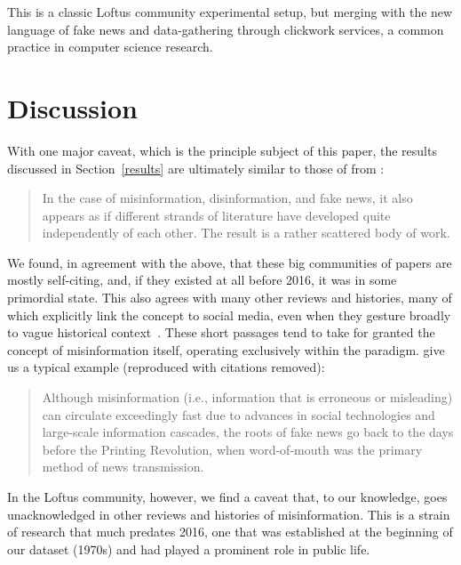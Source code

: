 \documentclass[          
 pre,
 twocolumn,
 twoside,
 superscriptaddress,
 amsmath,
 amssymb,                
 apsf
]{revtex4-2}
\begin{document}
This is a classic Loftus community experimental setup, but merging with the new language of fake news and data-gathering through clickwork services, a common practice in computer science research.

\section{Discussion}
\label{discussion}

With one major caveat, which is the principle subject of this paper, the results discussed in Section~\ref{results} are ultimately similar to those of from \citet{broda_misinformation_2024}:

\begin{quote}
In the case of misinformation, disinformation, and fake news, it also appears as if different strands of literature have developed quite independently of each other. The result is a rather scattered body of work.
\end{quote}

We found, in agreement with the above, that these big communities of papers are mostly self-citing, and, if they existed at all before 2016, it was in some primordial state. This also agrees with many other reviews and histories, many of which explicitly link the concept to social media, even when they gesture broadly to vague historical context~\cite{donovan_express_2025,perez-escolar_systematic_2023,miro-llinares_misinformation_2023, faedda_fake_2024}. These short passages tend to take for granted the concept of misinformation itself, operating exclusively within the paradigm. \citet{faedda_fake_2024} give us a typical example (reproduced with citations removed):

\begin{quote}
    Although misinformation (i.e., information that is erroneous or misleading) can circulate exceedingly fast due to advances in social technologies and large-scale information cascades, the roots of fake news go back to the days before the Printing Revolution, when word-of-mouth was the primary method of news transmission. 
\end{quote}

In the Loftus community, however, we find a caveat that, to our knowledge, goes unacknowledged in other reviews and histories of misinformation. This is a strain of research that much predates 2016, one that was established at the beginning of our dataset (1970s) and had played a prominent role in public life. 
\end{document}
